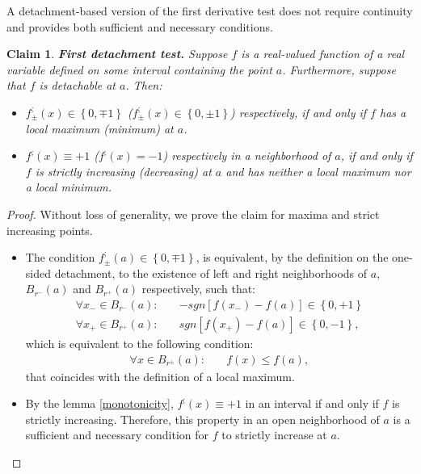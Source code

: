 \documentclass[11pt]{book}
\newtheorem{clm}[thm]{Claim}
\begin{document}
A detachment-based version of the first derivative test does not require
continuity and provides both sufficient and necessary conditions.
\begin{clm}\textbf{First detachment test. }Suppose $f$ is a real-valued function
of a real variable defined on some interval containing the point $a$.
Furthermore, suppose that $f$ is detachable at $a$. Then:
\begin{itemize}
\item $f_{\pm}^{;}\left(x\right)\in\left\{ 0,\mp1\right\} $ ($f_{\pm}^{;}\left(x\right)\in\left\{ 0,\pm1\right\} $)
respectively, if and only if $f$ has a local maximum (minimum) at
$a$.
\item $f^{;}\left(x\right)\equiv+1$ ($f^{;}\left(x\right)=-1$) respectively
in a neighborhood of $a$, if and only if $f$ is strictly increasing
(decreasing) at $a$ and has neither a local maximum nor a local minimum.
\end{itemize}
\label{first_detachment_test}
\end{clm}
\begin{proof}Without loss of generality, we prove the claim for maxima and
strict increasing points.
\begin{itemize}
\item The condition $f_{\pm}^{;}\left(a\right)\in\left\{ 0,\mp1\right\} $,
is equivalent, by the definition on the one-sided detachment, to the
existence of left and right neighborhoods of $a$, $B_{r^{-}}\left(a\right)$
and $B_{r^{+}}\left(a\right)$ respectively, such that:
\begin{align*}
\forall x_{-}\in B_{r^{-}}\left(a\right):\quad & -sgn\left[f\left(x_{-}\right)-f\left(a\right)\right]\in\left\{ 0,+1\right\} \\
\forall x_{+}\in B_{r^{+}}\left(a\right):\quad & sgn\left[f\left(x_{+}\right)-f\left(a\right)\right]\in\left\{ 0,-1\right\} ,
\end{align*}
which is equivalent to the following condition:
\begin{align*}
\forall x\in B_{r^{\pm}}\left(a\right):\quad & f\left(x\right)\leq f\left(a\right),
\end{align*}
that coincides with the definition of a local maximum.
\item By the lemma \ref{monotonicity}, $f^{;}\left(x\right)\equiv+1$ in an interval if
and only if $f$ is strictly increasing. Therefore, this property
in an open neighborhood of $a$ is a sufficient and necessary condition
for $f$ to strictly increase at $a$.
\end{itemize}
\end{proof}
\end{document}
